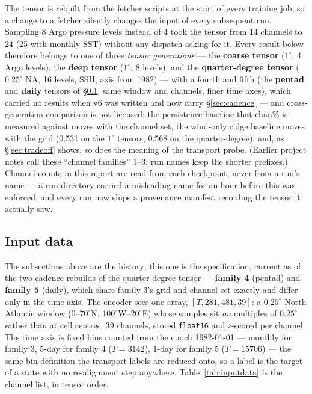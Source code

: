 \documentclass[10pt]{article}
\begin{document}
The tensor is rebuilt from the fetcher scripts at the start of every
training job, so a change to a fetcher silently changes the input of
every subsequent run. Sampling 8 Argo pressure levels instead of 4 took
the tensor from 14 channels to 24 (25 with monthly SST) without any
dispatch asking for it. Every result below therefore belongs to one of
three \emph{tensor generations} --- the \textbf{coarse tensor}
($1^\circ$, 4 Argo levels), the \textbf{deep tensor} ($1^\circ$, 8
levels), and the \textbf{quarter-degree tensor} ($0.25^\circ$ NA, 16
levels, SSH, axis from 1982) --- with a fourth and fifth (the
\textbf{pentad} and \textbf{daily} tensors of \S\ref{sec:inputdata},
same window and channels, finer time axes), which carried no results when
v6 was written and now carry \S\ref{sec:cadence} --- and cross-generation
comparison is not licensed: the persistence baseline that chan\% is measured against
moves with the channel set, the wind-only ridge baseline moves with the
grid (0.531 on the $1^\circ$ tensors, 0.568 on the quarter-degree), and,
as \S\ref{sec:tradeoff} shows, so does the meaning of
the transport probe. (Earlier project notes call these ``channel
families'' 1--3; run names keep the shorter prefixes.) Channel counts
in this report are read from each
checkpoint, never from a run's name --- a run directory carried a
misleading name for an hour before this was enforced, and every run now
ships a provenance manifest recording the tensor it actually saw.

\subsection{Input data}\label{sec:inputdata}

The subsections above are the history; this one is the specification,
current as of the two cadence rebuilds of the quarter-degree tensor ---
\textbf{family 4} (pentad) and \textbf{family 5} (daily), which share
family 3's grid and channel set exactly and differ only in the time
axis. The encoder sees one array, $[T, 281, 481, 39]$: a $0.25^\circ$
North Atlantic window ($0$--$70^\circ$N, $100^\circ$W--$20^\circ$E)
whose samples sit \emph{on} multiples of $0.25^\circ$ rather than at
cell centres, 39 channels, stored \texttt{float16} and z-scored per
channel. The time axis is fixed bins counted from the epoch
1982-01-01 --- monthly for family 3, 5-day for family 4 ($T{=}3142$),
1-day for family 5 ($T{=}15706$) --- the same bin definition the
transport labels are reduced onto, so a label is the target of a state
with no re-alignment step anywhere. Table~\ref{tab:inputdata} is the
channel list, in tensor order.
\end{document}
